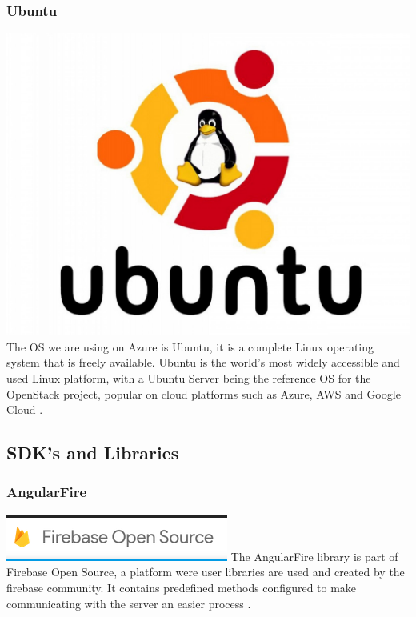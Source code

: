\subsubsection{Ubuntu}
\includegraphics[scale=0.025]{./img/Ubuntu.jpg}
The OS we are using on Azure is Ubuntu, it is a complete Linux operating system that is freely available. Ubuntu is the world's most widely accessible and used Linux platform, with a Ubuntu Server being the reference OS for the OpenStack project, popular on cloud platforms such as Azure, AWS and Google Cloud \cite{ubuntu}.

\subsection{SDK's and Libraries}
\subsubsection{AngularFire}
\includegraphics[scale=0.25]{./img/AngularFire.PNG}
The AngularFire library is part of Firebase Open Source, a platform were user libraries are used and created by the firebase community. It contains predefined methods configured to make communicating with the server an easier process \cite{angularfire}.

